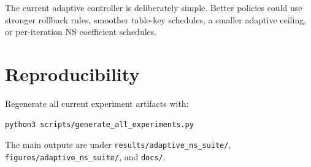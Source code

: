 \documentclass[11pt]{article}
\begin{document}
The current adaptive controller is deliberately simple. Better policies could use
stronger rollback rules, smoother table-key schedules, a smaller adaptive
ceiling, or per-iteration NS coefficient schedules.

\section{Reproducibility}

Regenerate all current experiment artifacts with:
\begin{verbatim}
python3 scripts/generate_all_experiments.py
\end{verbatim}

The main outputs are under \verb|results/adaptive_ns_suite/|,
\verb|figures/adaptive_ns_suite/|, and \verb|docs/|.
\end{document}
